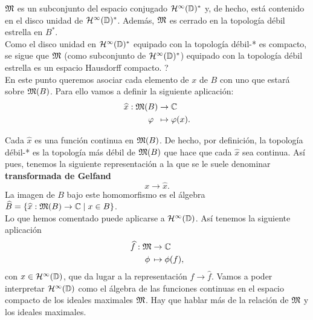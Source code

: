 $\mathfrak{M}$ es un subconjunto del espacio conjugado $\mathcal{H}^{\infty}(\mathbb{D})^*$ y, de hecho, está contenido en el disco unidad de $\mathcal{H}^{\infty}(\mathbb{D})^*$. Además, $\mathfrak{M}$ es cerrado en la topología débil estrella en $B^*$. \\

Como el disco unidad en $\mathcal{H}^{\infty}(\mathbb{D})^*$ equipado con la topología débil-* es compacto, se sigue que $\mathfrak{M}$ (como subconjunto de $\mathcal{H}^{\infty}(\mathbb{D})^*$) equipado con la topología débil estrella es un espacio Hausdorff compacto. ? \\

En este punto queremos asociar cada elemento de $x$ de $B$ con uno que estará sobre $\mathfrak{M}(B)$. Para ello vamos a definir la siguiente aplicación:
\begin{equation*}
    \begin{split}
        \widehat x:  \mathfrak{M}(B) & \rightarrow  \mathbb{C} \\
                 \varphi \, \, \, & \mapsto  \varphi (x).
    \end{split}
\end{equation*}

Cada $\widehat x$ es una función continua en $\mathfrak{M} (B)$. De hecho, por definición, la topología débil-* es la topología más débil de $\mathfrak{M} (B)$ que hace que cada $\widehat x$ sea continua. Así pues, tenemos la siguiente representación a la que se le suele denominar \textbf{transformada de Gelfand}
\begin{equation*}
    x \rightarrow \widehat x.
\end{equation*}
La imagen de $B$ bajo este homomorfismo es el álgebra $\widehat B = \{\widehat x: \mathfrak{M}(B) \rightarrow  \mathbb{C} \mid x \in B\}$. \\

Lo que hemos comentado puede aplicarse a $\mathcal{H}^{\infty}(\mathbb{D})$. Así tenemos la siguiente aplicación
\begin{equation*}
    \begin{split}
        \widehat f:  \mathfrak{M} & \rightarrow  \mathbb{C} \\
                \phi \, & \mapsto  \phi (f),
    \end{split}
\end{equation*}
con $x \in \mathcal{H}^{\infty}(\mathbb{D})$, que da lugar a la representación $f \rightarrow \widehat f$. Vamos a poder interpretar $\mathcal{H}^{\infty}(\mathbb{D})$ como el álgebra de las funciones continuas en el espacio compacto de los ideales maximales $\mathfrak{M}$. Hay que hablar más de la relación de $\mathfrak{M}$ y los ideales maximales. \\

